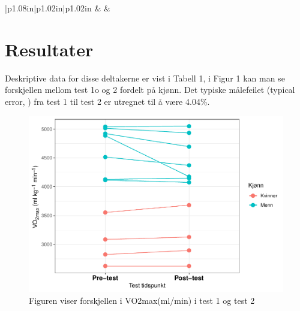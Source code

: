 \documentclass[
]{book}
\begin{document}
\begin{longtable}[c]{|p{1.08in}|p{1.02in}|p{1.02in}}
 &  &  \\




\end{longtable}

\hypertarget{resultater-1}{%
\section{Resultater}\label{resultater-1}}

Deskriptive data for disse deltakerne er vist i Tabell 1, i Figur 1 kan man se forskjellen mellom test 1o og 2 fordelt på kjønn. Det typiske målefeilet (typical error, \citep{hopkins2000}) fra test 1 til test 2 er utregnet til å være 4.04\%.

\begin{figure}
\centering
\includegraphics{_main_files/figure-latex/Figur-1.pdf}
\caption{\label{fig:Figur}Figuren viser forskjellen i VO2max(ml/min) i test 1 og test 2}
\end{figure}
\end{document}
